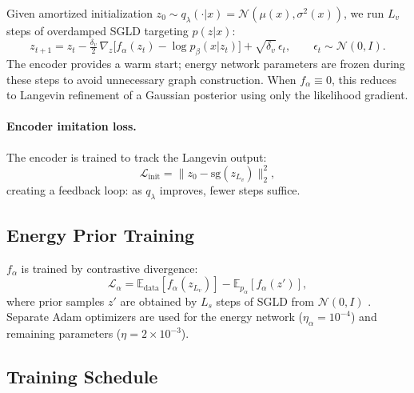 \documentclass[10pt]{article}
\newcommand{\E}{\mathbb{E}}
\newcommand{\sg}{\mathrm{sg}}
\begin{document}
Given amortized initialization $z_0 \sim q_\lambda(\cdot|x) = \mathcal{N}(\mu(x),\sigma^2(x))$,
we run $L_v$ steps of overdamped SGLD targeting $p(z|x)$:
\begin{equation}
    z_{t+1} = z_t - \tfrac{\delta_v}{2}\,\nabla_z\!\bigl[
        f_\alpha(z_t) - \log p_\beta(x|z_t)
    \bigr] + \sqrt{\delta_v}\,\epsilon_t,\qquad
    \epsilon_t \sim \mathcal{N}(0,I).
    \label{eq:langevin}
\end{equation}
The encoder provides a warm start; energy network parameters are frozen during these
steps to avoid unnecessary graph construction. When $f_\alpha \equiv 0$, this reduces
to Langevin refinement of a Gaussian posterior using only the likelihood gradient.

\paragraph{Encoder imitation loss.}
The encoder is trained to track the Langevin output:
\begin{equation}
    \mathcal{L}_{\mathrm{init}} = \|z_0 - \sg(z_{L_v})\|_2^2,
    \label{eq:imitation}
\end{equation}
creating a feedback loop: as $q_\lambda$ improves, fewer steps suffice.

\subsection{Energy Prior Training}

$f_\alpha$ is trained by contrastive divergence:
\begin{equation}
    \mathcal{L}_\alpha = \E_{\mathrm{data}}[f_\alpha(z_{L_v})] - \E_{p_\alpha}[f_\alpha(z')],
    \label{eq:cd}
\end{equation}
where prior samples $z'$ are obtained by $L_s$ steps of SGLD from $\mathcal{N}(0,I)$
\citep{nijkamp2019shortrun}. Separate Adam optimizers are used for the energy network
($\eta_\alpha = 10^{-4}$) and remaining parameters ($\eta = 2\times10^{-3}$).

\subsection{Training Schedule}
\end{document}
